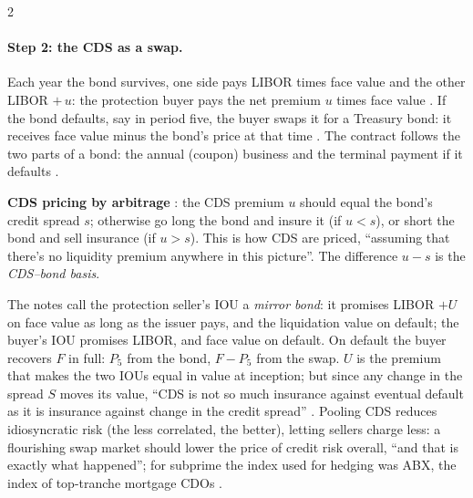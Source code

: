 \begin{paracol}{2}
\paragraph{Step 2: the CDS as a swap.} Each year the bond survives, one side pays LIBOR times face value and the other LIBOR $+\,u$: the protection buyer pays the net
premium $u$ times face value . If the bond defaults, say in period five, the buyer
swaps it for a Treasury bond: it receives face value minus the bond's price at that time . The contract follows the
two parts of a bond: the annual (coupon) business and the terminal payment if it defaults .

\begin{nfigure}
\caption{Cash flows to the protection buyer: the premium $u$ times face value $F$ while the bond survives, face value minus the bond's price $P_5$ at default
.}\label{fig:cds-flows}
\end{nfigure}

\begin{keyformulas}
\textbf{CDS pricing by arbitrage} : the CDS premium $u$ should equal the bond's credit spread $s$;
otherwise go long the bond and insure it (if $u<s$), or short the bond and sell insurance (if $u>s$). This is how CDS are priced, ``assuming that there's no
liquidity premium anywhere in this picture''. The difference $u-s$ is the \emph{CDS--bond basis}.
\end{keyformulas}

The notes call the protection seller's IOU a \emph{mirror bond}: it promises LIBOR $+U$ on face value as long as the issuer pays, and the liquidation value on default; the buyer's IOU promises
LIBOR, and face value on default. On default the buyer recovers $F$ in full: $P_5$ from the bond, $F-P_5$ from the swap. $U$ is the premium that makes the two IOUs equal in value at inception; but
since any change in the spread $S$ moves its value, ``CDS is not so much insurance against eventual default as it is insurance against change in the credit spread'' . Pooling
CDS reduces idiosyncratic risk (the less correlated, the better), letting sellers charge less: a flourishing swap market should lower the price of credit risk overall, ``and that is exactly what
happened''; for subprime the index used for hedging was ABX, the index of top-tranche mortgage CDOs .


\end{paracol}
